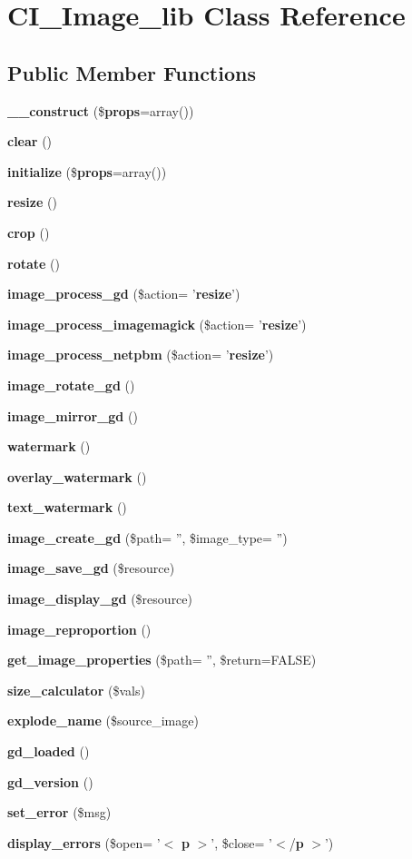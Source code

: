 \section{C\-I\-\_\-\-Image\-\_\-lib Class Reference}
\label{class_c_i___image__lib}
\subsection*{Public Member Functions}
\begin{DoxyCompactItemize}
\item 
{\bf \-\_\-\-\_\-construct} (\${\bf props}=array())
\item 
{\bf clear} ()
\item 
{\bf initialize} (\${\bf props}=array())
\item 
{\bf resize} ()
\item 
{\bf crop} ()
\item 
{\bf rotate} ()
\item 
{\bf image\-\_\-process\-\_\-gd} (\$action= '{\bf resize}')
\item 
{\bf image\-\_\-process\-\_\-imagemagick} (\$action= '{\bf resize}')
\item 
{\bf image\-\_\-process\-\_\-netpbm} (\$action= '{\bf resize}')
\item 
{\bf image\-\_\-rotate\-\_\-gd} ()
\item 
{\bf image\-\_\-mirror\-\_\-gd} ()
\item 
{\bf watermark} ()
\item 
{\bf overlay\-\_\-watermark} ()
\item 
{\bf text\-\_\-watermark} ()
\item 
{\bf image\-\_\-create\-\_\-gd} (\$path= '', \$image\-\_\-type= '')
\item 
{\bf image\-\_\-save\-\_\-gd} (\$resource)
\item 
{\bf image\-\_\-display\-\_\-gd} (\$resource)
\item 
{\bf image\-\_\-reproportion} ()
\item 
{\bf get\-\_\-image\-\_\-properties} (\$path= '', \$return=F\-A\-L\-S\-E)
\item 
{\bf size\-\_\-calculator} (\$vals)
\item 
{\bf explode\-\_\-name} (\$source\-\_\-image)
\item 
{\bf gd\-\_\-loaded} ()
\item 
{\bf gd\-\_\-version} ()
\item 
{\bf set\-\_\-error} (\$msg)
\item 
{\bf display\-\_\-errors} (\$open= '$<$ {\bf p} $>$', \$close= '$<$/{\bf p} $>$')
\end{DoxyCompactItemize}
